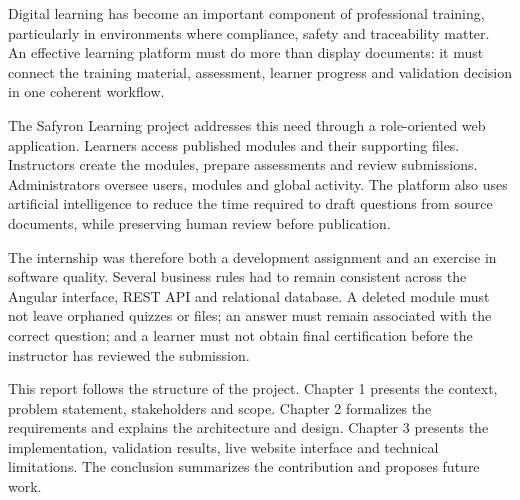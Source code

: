 Digital learning has become an important component of professional training,
particularly in environments where compliance, safety and traceability matter.
An effective learning platform must do more than display documents: it must
connect the training material, assessment, learner progress and validation
decision in one coherent workflow.

The Safyron Learning project addresses this need through a role-oriented web
application. Learners access published modules and their supporting files.
Instructors create the modules, prepare assessments and review submissions.
Administrators oversee users, modules and global activity. The platform also
uses artificial intelligence to reduce the time required to draft questions
from source documents, while preserving human review before publication.

The internship was therefore both a development assignment and an exercise in
software quality. Several business rules had to remain consistent across the
Angular interface, REST API and relational database. A deleted module must not
leave orphaned quizzes or files; an answer must remain associated with the
correct question; and a learner must not obtain final certification before the
instructor has reviewed the submission.

This report follows the structure of the project. Chapter 1 presents the
context, problem statement, stakeholders and scope. Chapter 2 formalizes the
requirements and explains the architecture and design. Chapter 3 presents the
implementation, validation results, live website interface and technical
limitations. The conclusion summarizes the contribution and proposes future
work.
